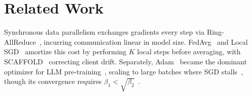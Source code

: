 \documentclass{article}
\begin{document}





\section{Related Work}
\label{sec:related}
\label{sec:extended_related_work}

Synchronous data parallelism exchanges gradients every step via
Ring-AllReduce~\citep{sergeev2018horovodfasteasydistributed,li2020pytorch},
incurring communication linear in model size.
FedAvg~\citep{mcmahan2017communication} and Local
SGD~\citep{stich2019local,yu2019linearspeedupanalysiscommunication} amortize
this cost by performing $K$ local steps before averaging, with
SCAFFOLD~\citep{karimireddy2021scaffoldstochasticcontrolledaveraging} correcting
client drift. Separately, Adam~\citep{kingma2017adammethodstochasticoptimization}
became the dominant optimizer for LLM
pre-training~\citep{brown2020languagemodelsfewshotlearners,grattafiori2024llama3herdmodels},
scaling to large batches where SGD
stalls~\citep{kunstner2023noisemainfactorgap}, though its convergence requires
$\beta_1 < \sqrt{\beta_2}$~\citep{reddi2019convergenceadam,zhang2023adamconvergemodificationupdate}.
\end{document}
